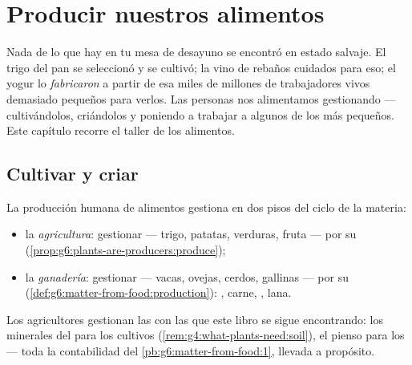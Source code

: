 \chapter{Producir nuestros alimentos}\label{ch:g6:producing-our-food}

Nada de lo que hay en tu mesa de desayuno se encontró en estado
salvaje. El trigo del pan se seleccionó y se cultivó; la  vino de
rebaños cuidados para eso; el yogur lo \emph{fabricaron} a partir de
esa  miles de millones de trabajadores vivos demasiado pequeños
para verlos. Las personas nos alimentamos gestionando  ---
cultivándolos, criándolos y poniendo a trabajar a algunos de los más
pequeños. Este capítulo recorre el taller de los alimentos.

\section{Cultivar y criar}

\begin{definition}\label{def:g6:producing-our-food:farming}
La producción humana de alimentos gestiona  en dos pisos del
ciclo de la materia:
\begin{itemize}
  \item la \emph{agricultura}: gestionar  ---
        trigo, patatas, verduras, fruta --- por su 
        (\cref{prop:g6:plants-are-producers:produce});
  \item la \emph{ganadería}: gestionar  ---
        vacas, ovejas, cerdos, gallinas --- por su  (\cref{def:g6:matter-from-food:production}): ,
        carne, , lana.
\end{itemize}
Los agricultores gestionan las  con las que este libro se
sigue encontrando: los minerales del  para los cultivos
(\cref{rem:g4:what-plants-need:soil}), el pienso para los  ---
toda la contabilidad del \cref{pb:g6:matter-from-food:1}, llevada a
propósito.
\end{definition}

